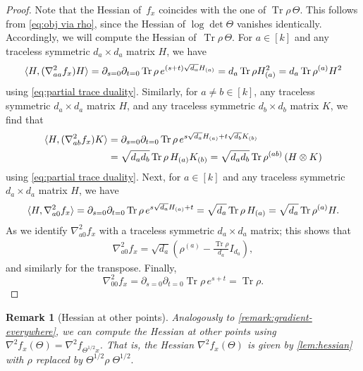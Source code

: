 \documentclass[aos]{imsart}
\newtheorem{remark}[theorem]{Remark}
\theoremstyle{definition}
\numberwithin{equation}{section}
\DeclareMathOperator{\tr}{Tr}
\newcommand{\R}{{\mathbb{R}}}
\renewcommand{\H}{{\mathbb{H}}}
\newcommand{\ot}{\otimes}
\begin{document}
\begin{proof}
  Note that the Hessian of~$f_x$ coincides with the one of $\tr\rho\,\Theta$.
  This follows from \cref{eq:obj via rho}, since the Hessian of $\log\det\Theta$ vanishes identically.
  Accordingly, we will compute the Hessian of~$\tr\rho\,\Theta$.
  For $a\in[k]$ and any traceless symmetric $d_a\times d_a$ matrix $H$, we have
  \begin{align*}
    \braket{H, (\nabla^2_{aa} f_x) H}
  = \partial_{s=0} \partial_{t=0} \tr \rho \, e^{(s+t) \sqrt{d_a} H_{(a)}}
  = d_a \tr \rho H_{(a)}^2
  = d_a \tr \rho^{(a)} H^2
  \end{align*}
  using \cref{eq:partial trace duality}.
  Similarly, for $a\neq b\in[k]$, any traceless symmetric $d_a\times d_a$ matrix $H$, and any traceless symmetric $d_b\times d_b$ matrix $K$, we find that
  \begin{align*}
    \braket{H, (\nabla^2_{ab} f_x) K}
  &= \partial_{s=0} \partial_{t=0} \tr \rho \, e^{s \sqrt{d_a} H_{(a)} + t \sqrt{d_b} K_{(b)}} \\
  &= \sqrt{d_a d_b} \tr \rho \, H_{(a)} K_{(b)}
  = \sqrt{d_a d_b} \tr \rho^{(ab)} \left( H \ot K \right)
  \end{align*}
  using \cref{eq:partial trace duality}.
  Next, for $a\in[k]$ and any traceless symmetric $d_a\times d_a$ matrix $H$, we have
  \begin{align*}
    \braket{H, \nabla^2_{a0} f_x}
  = \partial_{s=0} \partial_{t=0} \tr \rho \, e^{s\sqrt{d_a} H_{(a)} + t}
  = \sqrt{d_a} \tr \rho \, H_{(a)}
  = \sqrt{d_a} \tr \rho^{(a)} H.
  \end{align*}
  As we identify $\nabla^2_{a0} f_x$ with a traceless symmetric $d_a\times d_a$ matrix;
  this shows that
  \begin{align*}
    \nabla^2_{a0} f_x = \sqrt{d_a} \left( \rho^{(a)} - \frac{\tr \rho}{d_a} I_{d_a} \right),
  \end{align*}
  and similarly for the transpose.
  Finally,
  \[
    \nabla^2_{00} f_x
  = \partial_{s=0} \partial_{t=0} \tr \rho \, e^{s+t}
  = \tr \rho.
  \]
\end{proof}

\begin{remark}[Hessian at other points]\label{remark:hessian-everywhere}
Analogously to \cref{remark:gradient-everywhere}, we can compute the Hessian at other points using $\nabla^2 f_{x}(\Theta) = \nabla^2 f_{\Theta^{1/2} x}$. That is, the Hessian $\nabla^2 f_{x}(\Theta)$ is given by \cref{lem:hessian} with $\rho$ replaced by $\Theta^{1/2}\rho\; \Theta^{1/2}.$
\end{remark}
\end{document}
